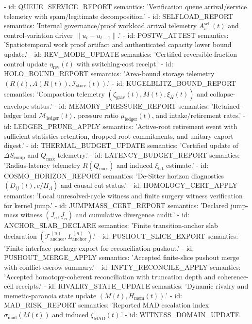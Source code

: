 \documentclass[11pt,a4paper]{article}
\newcommand{\cT}{\mathcal{T}}
\theoremstyle{definition}
\theoremstyle{remark}
\begin{document}
\begin{YAMLtiny}
  - id: QUEUE\_SERVICE\_REPORT
    semantics: 'Verification queue arrival/service telemetry with spam/legitimate decomposition.'
  - id: SELFLOAD\_REPORT
    semantics: 'Internal governance/proof workload arrival telemetry $A_v^{\mathrm{self}}(t)$ and control-variation driver $\|u_t-u_{t-1}\|$.'
  - id: POSTW\_ATTEST
    semantics: 'Spatiotemporal work proof artifact and authenticated capacity lower bound update.'
  - id: REV\_MODE\_UPDATE
    semantics: 'Certified reversible-fraction control update $\eta_{\mathrm{rev}}(t)$ with switching-cost receipt.'
  - id: HOLO\_BOUND\_REPORT
    semantics: 'Area-bound storage telemetry $(R(t),A(R(t)),\mathcal I_{\mathrm{store}}(t))$.'
  - id: KUGELBLITZ\_BOUND\_REPORT
    semantics: 'Compaction telemetry $(\zeta_{\mathrm{grav}}(t),M(t),\xi_H(t))$ and collapse-envelope status.'
  - id: MEMORY\_PRESSURE\_REPORT
    semantics: 'Retained-ledger load $\mathcal M_{\mathrm{ledger}}(t)$, pressure ratio $\mu_{\mathrm{ledger}}(t)$, and intake/retirement rates.'
  - id: LEDGER\_PRUNE\_APPLY
    semantics: 'Active-root retirement event with sufficient-statistics retention, dropped-root commitments, and unitary export digest.'
  - id: THERMAL\_BUDGET\_UPDATE
    semantics: 'Certified update of $\Delta S_{\mathrm{comp}}$ and $Q_{\max}$ telemetry.'
  - id: LATENCY\_BUDGET\_REPORT
    semantics: 'Radius-latency telemetry $R(Q_{\max})$ and induced $\xi_{\mathrm{lat}}$ estimate.'
  - id: COSMO\_HORIZON\_REPORT
    semantics: 'De-Sitter horizon diagnostics $(D_{ij}(t),c/H_\Lambda)$ and causal-cut status.'
  - id: HOMOLOGY\_CERT\_APPLY
    semantics: 'Local unresolved-cycle witness and finite surgery witness verification for kernel jump.'
  - id: JUMPMASS\_CERT\_REPORT
    semantics: 'Declared jump-mass witness $(J_n,\underline J_n)$ and cumulative divergence audit.'
  - id: ANCHOR\_SLAB\_DECLARE
    semantics: 'Finite transition-anchor slab declaration $(\cT_{\mathrm{anchor}}^{(n)},L_{\mathrm{anchor}}^{(n)})$.'
  - id: PUSHOUT\_SLICE\_EXPORT
    semantics: 'Finite interface package export for reconciliation pushout.'
  - id: PUSHOUT\_MERGE\_APPLY
    semantics: 'Accepted finite-slice pushout merge with conflict escrow summary.'
  - id: INFTY\_RECONCILE\_APPLY
    semantics: 'Accepted homotopy-coherent reconciliation with truncation depth and coherence-cell receipts.'
  - id: RIVALRY\_STATE\_UPDATE
    semantics: 'Dynamic rivalry and memetic-paranoia state update $(M(t),H_{\mathrm{mem}}(t))$.'
  - id: MAD\_RISK\_REPORT
    semantics: 'Reported MAD escalation index $\sigma_{\mathrm{mad}}(M(t))$ and induced $\xi_{\mathrm{MAD}}(t)$.'
  - id: WITNESS\_DOMAIN\_UPDATE

\end{YAMLtiny}
\end{document}
